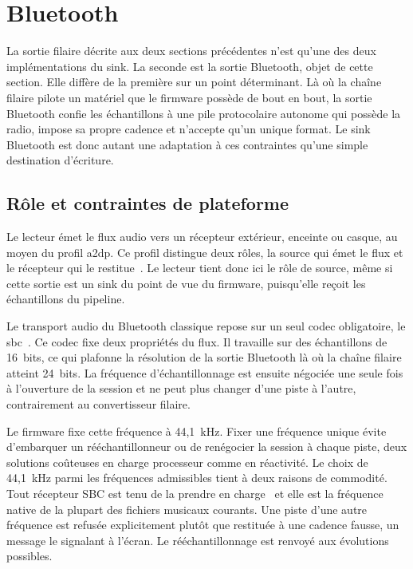 \section{Bluetooth}
\label{sec:soft_bluetooth}

La sortie filaire décrite aux deux sections précédentes n'est qu'une des deux implémentations du \gls{sink}. La seconde est la sortie Bluetooth, objet de cette section. Elle diffère de la première sur un point déterminant. Là où la chaîne filaire pilote un matériel que le firmware possède de bout en bout, la sortie Bluetooth confie les échantillons à une pile protocolaire autonome qui possède la radio, impose sa propre cadence et n'accepte qu'un unique format. Le sink Bluetooth est donc autant une adaptation à ces contraintes qu'une simple destination d'écriture.

\subsection{Rôle et contraintes de plateforme}

Le lecteur émet le flux audio vers un récepteur extérieur, enceinte ou casque, au moyen du profil \gls{a2dp}. Ce profil distingue deux rôles, la source qui émet le flux et le récepteur qui le restitue~\cite{bluetooth_sig_a2dp}. Le lecteur tient donc ici le rôle de source, même si cette sortie est un sink du point de vue du firmware, puisqu'elle reçoit les échantillons du pipeline.

Le transport audio du Bluetooth classique repose sur un seul codec obligatoire, le \gls{sbc}~\cite{bluetooth_sig_a2dp}. Ce codec fixe deux propriétés du flux. Il travaille sur des échantillons de 16~bits, ce qui plafonne la résolution de la sortie Bluetooth là où la chaîne filaire atteint 24~bits. La fréquence d'échantillonnage est ensuite négociée une seule fois à l'ouverture de la session et ne peut plus changer d'une piste à l'autre, contrairement au convertisseur filaire.

Le firmware fixe cette fréquence à 44,1~kHz. Fixer une fréquence unique évite d'embarquer un rééchantillonneur ou de renégocier la session à chaque piste, deux solutions coûteuses en charge processeur comme en réactivité. Le choix de 44,1~kHz parmi les fréquences admissibles tient à deux raisons de commodité. Tout récepteur SBC est tenu de la prendre en charge~\cite{bluetooth_sig_a2dp} et elle est la fréquence native de la plupart des fichiers musicaux courants. Une piste d'une autre fréquence est refusée explicitement plutôt que restituée à une cadence fausse, un message le signalant à l'écran. Le rééchantillonnage est renvoyé aux évolutions possibles.

